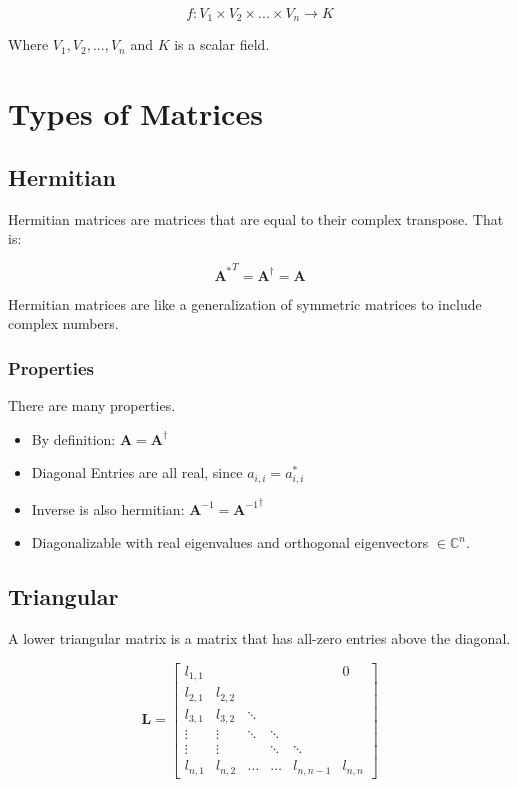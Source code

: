 \begin{equation}
f: V_1 \times V_2 \times ... \times V_n \rightarrow K
\end{equation}

Where $V_1, V_2, ... , V_n$ and $K$ is a scalar field.


\section{Types of Matrices}

\subsection{Hermitian}
Hermitian matrices are matrices that are equal to their complex transpose. That is:

\begin{equation}
{\mathbf{A}^{*}}^T = \mathbf{A}^\dagger = \mathbf{A} 
\end{equation}

Hermitian matrices are like a generalization of symmetric matrices to include complex numbers. 

\subsubsection{Properties}
There are many properties. 
\begin{itemize}
\item By definition: $\mathbf{A} = \mathbf{A}^\dagger$
\item Diagonal Entries are all real, since $a_{i,i} = a_{i,i}^*$
\item Inverse is also hermitian:  $\mathbf{A}^{-1} ={ \mathbf{A}^{-1}}^\dagger$
\item Diagonalizable with real eigenvalues and orthogonal eigenvectors $\in \mathbb{C}^n$.
\end{itemize}


\subsection{Triangular}
A lower triangular matrix is a matrix that has all-zero entries above the diagonal.

\begin{equation}
\mathbf{L} = \left[\begin{array}{cccccc} l_{1,1}&&&&&0\\l_{2,1}&l_{2,2}&&&&\\l_{3,1}&l_{3,2}&\ddots&&&\\  \vdots&\vdots&\ddots&\ddots&&\\ \vdots&\vdots&&\ddots&\ddots&\\  l_{n,1}&l_{n,2}&\hdots&\hdots&l_{n,n-1}&l_{n,n}\end{array}\right]
\end{equation}

